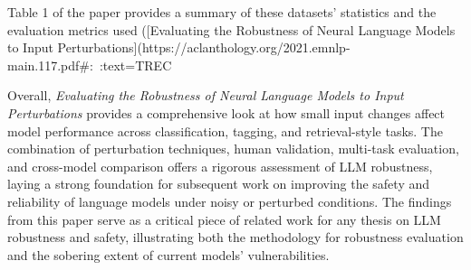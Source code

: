 Table 1 of the paper provides a summary of these datasets’ statistics and the evaluation metrics used ([Evaluating the Robustness of Neural Language Models to Input Perturbations](https://aclanthology.org/2021.emnlp-main.117.pdf#:~:text=TREC%

Overall, \textit{Evaluating the Robustness of Neural Language Models to Input Perturbations} provides a comprehensive look at how small input changes affect model performance across classification, tagging, and retrieval-style tasks. The combination of perturbation techniques, human validation, multi-task evaluation, and cross-model comparison offers a rigorous assessment of LLM robustness, laying a strong foundation for subsequent work on improving the safety and reliability of language models under noisy or perturbed conditions. The findings from this paper serve as a critical piece of related work for any thesis on LLM robustness and safety, illustrating both the methodology for robustness evaluation and the sobering extent of current models’ vulnerabilities.